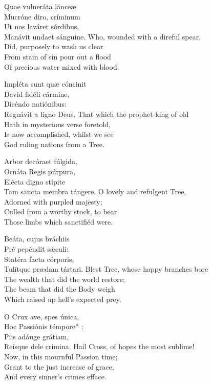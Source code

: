 
\setlength{\preverseskip}{6pt}

Quae vulneráta lánceæ\\
Mucróne diro, críminum\\
Ut nos laváret sórdibus,\\
Manávit unda\lyrlink{}et sánguine.
\divverse
Who, wounded with a direful spear,\\
Did, purposely to wash us clear\\
From stain of sin pour out a flood\\
Of precious water mixed with blood.
\finishverse


Impléta sunt quæ cóncinit\\
David fidéli cármine,\\
Dicéndo natiónibus:\\
Regnávit a ligno Deus.
\divverse
That which the prophet-king of old\\
Hath in mysterious verse foretold,\\
Is now accomplished, whilst we see\\
God ruling nations from a Tree.
\finishverse


Arbor decóra\lyrlink{}et fúlgida,\\
Ornáta Regis púrpura,\\
Elécta digno stípite\\
Tam sancta membra tángere. 
\divverse
O lovely and refulgent Tree,\\
Adorned with purpled majesty;\\
Culled from a worthy stock, to bear\\
Those limbs which sanctifiéd were.
\finishverse


Beáta, cujus bráchiis\\
	Pré pepéndit sǽculi:\\
Statéra facta córporis,\\
Tulítque prædam tártari.
\divverse
Blest Tree, whose happy branches
bore\\
The wealth that did the world restore;\\
The beam that did the Body weigh\\
Which raised up hell’s expected prey.
\finishverse


O Crux ave, spes única,\\
Hoc Passiónis témpore* :\\
Piis adáuge grátiam,\\
Reísque dele crímina.
\divverse
Hail Cross, of hopes the most
sublime!\\
Now, in this mournful Passion time;\\
Grant to the just increase of grace,\\
And every sinner’s crimes efface.
\finishverse



